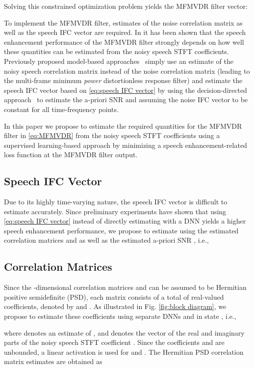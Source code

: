 \documentclass{article}
\begin{document}
Solving this constrained optimization problem yields the MFMVDR filter vector:


To implement the MFMVDR filter, estimates of the noise correlation matrix  as well as the speech IFC vector  are required. 
In \cite{schasse_estimation_2014,fischer_sensitivity_2017} it has been shown that the speech enhancement performance of the MFMVDR filter strongly depends on how well these quantities can be estimated from the noisy speech STFT coefficients.
Previously proposed model-based approaches~\cite{schasse_estimation_2014,fischer_subspace-based_2020} simply use an estimate of the noisy speech correlation matrix  instead of the noise correlation matrix  (leading to the multi-frame minimum \emph{power} distortionless response filter) and estimate the speech IFC vector  based on \eqref{eq:speech IFC vector} by using the decision-directed approach~\cite{ephraim_speech_1984} to estimate the a-priori SNR  and assuming the noise IFC vector  to be constant for all time-frequency points.

In this paper we propose to estimate the required quantities for the MFMVDR filter in \eqref{eq:MFMVDR} from the noisy speech STFT coefficients using a supervised learning-based approach by minimizing a speech enhancement-related loss function at the MFMVDR filter output.

\subsection{Speech IFC Vector}
Due to its highly time-varying nature, the speech IFC vector  is difficult to estimate accurately.
Since preliminary experiments have shown that using \eqref{eq:speech IFC vector} instead of directly estimating  with a DNN yields a higher speech enhancement performance, we propose to estimate  using the estimated correlation matrices  and  as well as the estimated a-priori SNR , i.e.,


\subsection{Correlation Matrices}
\label{sec:correlation matrices}
Since the -dimensional correlation matrices  and  can be assumed to be Hermitian positive semidefinite (PSD), each matrix consists of a total of  real-valued coefficients, denoted by  and .
As illustrated in Fig. \ref{fig:block diagram}, we propose to estimate these coefficients using separate DNNs  and  in state , i.e.,

where  denotes an estimate of , and  denotes the vector of the real and imaginary parts of the noisy speech STFT coefficient .
Since the coefficients  and  are unbounded, a linear activation is used for  and .
The Hermitian PSD correlation matrix estimates are obtained as
\end{document}
